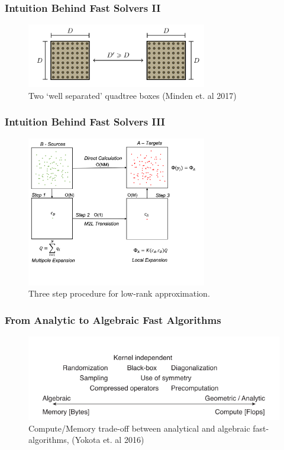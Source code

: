 \begin{frame}
    \frametitle{Intuition Behind Fast Solvers II}
        \begin{figure}
            \includegraphics[width=0.7\textwidth]{assets/well_separated.png}
            \caption*{Two `well separated' quadtree boxes (Minden et. al 2017)}
        \end{figure}


\end{frame}

\begin{frame}
    \frametitle{Intuition Behind Fast Solvers III}
        \begin{figure}
            \includegraphics[width=0.7\textwidth]{assets/three_step.png}
            \caption*{Three step procedure for low-rank approximation.}
        \end{figure}


\end{frame}


\begin{frame}
    \frametitle{From Analytic to Algebraic Fast Algorithms}

    \begin{figure}
        \includegraphics[width=\textwidth]{assets/analytical_algebraic.png}
        \caption*{Compute/Memory trade-off between analytical and algebraic fast-algorithms, (Yokota et. al 2016)}
    \end{figure}

\end{frame}


